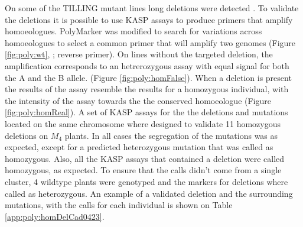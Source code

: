 On some of the TILLING mutant lines long deletions were detected \citep{Krasileva2016}.
To validate the deletions it is possible to use KASP assays to produce primers that amplify homoeologues.  
PolyMarker was modified to search for variations across homoeologues to select a common primer that will amplify two genomes (Figure \ref{fig:poly:wt}, ; reverse primer). 
On lines without the targeted deletion, the amplification corresponds to an hetrerozygous assay with equal signal for both the A and the B allele. (Figure \ref{fig:poly:homFalse}).  
When a deletion is present the results of the assay resemble the results for a homozygous individual, with the intensity of the assay towards the the conserved homoeologue (Figure \ref{fig:poly:homReal}).
A set of KASP assays for the the deletions and mutations located on the same chromosome where designed to validate 11 homozygous deletions on $M_{4}$ plants. 
In all cases the segregation of the mutations was as expected, except for a predicted heterozygous mutation that was called as homozygous. 
Also, all the KASP assays that contained a deletion were called homozygous, as expected. 
To ensure that the calls didn't come from a single cluster, 4 wildtype plants were genotyped and the markers for deletions where called as heterozygous. 
An example of a validated deletion and the surrounding mutations, with the calls for each individual is shown on Table \ref{app:poly:homDelCad0423}. 
  
